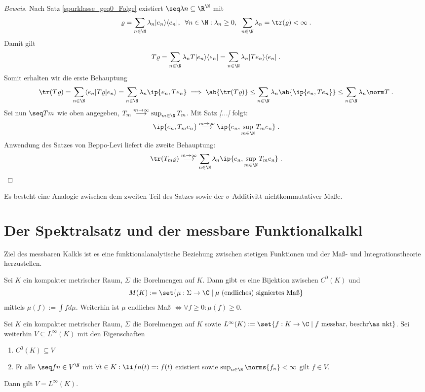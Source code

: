 \begin{proof}[Beweis]
	Nach Satz \ref{spurklasse_geq0_Folge} existiert \(\seq \lambda n \subseteq \R^\N\) mit 
	\[\varrho = \sum_{n\in\N} \lambda_n | e_n \rangle \langle e_n |, \;\; \forall n\in\N: \lambda_n \geq 0, \;\;\sum_{n\in\N} \lambda_n = \tr(\varrho) < \infty\;.\]
	Damit gilt
	\[T\varrho = \sum_{n\in\N} \lambda_n T | e_n \rangle \langle e_n | = \sum_{n\in\N} \lambda_n | Te_n \rangle \langle e_n | \;.\]
	Somit erhalten wir die erste Behauptung
	\[\tr(T\varrho) = \sum_{n\in\N} \langle e_n | T\varrho | e_n \rangle = \sum_{n\in\N} \lambda_n \ip{e_n, Te_n} \implies \ab{\tr(T\varrho)} \leq \sum_{n\in\N} \lambda_n \ab{\ip{e_n, Te_n}} \leq \sum_{n\in\N} \lambda_n\norm T\;.\]
	Sei nun \(\seq Tm\) wie oben angegeben, \(T_m \overset{m\to\infty}{\longrightarrow} \sup_{m\in\N}T_m\). Mit Satz \textit{[...]} folgt:
	\[\ip{e_n, T_m e_n} \overset{m\to\infty}{\longrightarrow} \ip{e_n, \sup_{m\in\N} T_m e_n}\;.\]
	Anwendung des Satzes von Beppo-Levi liefert die zweite Behauptung:
	\[\tr(T_m\varrho)\overset{m\to\infty}{\longrightarrow}  \sum_{n\in\N} \lambda_n\ip{e_n, \sup_{m\in\N} T_m e_n}\;.\]
\end{proof}
\begin{rem}
	Es besteht eine Analogie zwischen dem zweiten Teil des Satzes sowie der $\sigma$-Additivit\as t nichtkommutativer Ma\ss{}e. 
\end{rem}

\section{Der Spektralsatz und der messbare Funktionalkalk\us l}
\begin{rem}
	Ziel des messbaren Kalk\us ls ist es eine funktionalanalytische Beziehung zwischen stetigen Funktionen und der Ma\ss{}- und Integrationstheorie herzustellen.
\end{rem}

\begin{theorem}
	Sei $K$ ein kompakter metrischer Raum, $\Sigma$ die Borelmengen auf $K$. Dann gibt es eine Bijektion zwischen $C^0(K)$ und 
	\[M(K) := \set{\mu:\Sigma \to \C\;\vert\; \mu \text{ (endliches) signiertes Ma\ss{}}}\]
	mittels \(\mu(f):= \int f d\mu\). Weiterhin ist $\mu$ endliches Ma\ss{} \(\iff \forall f \geq 0 : \mu(f) \geq 0\).
\end{theorem}

\begin{theorem}
	Sei $K$ ein kompakter metrischer Raum, $\Sigma$ die Borelmengen auf $K$ sowie \(L^\infty(K):= \set{f: K\to\C\;\vert\; f \text{ messbar, beschr\as nkt}}\). Sei weiterhin \(V\subseteq L^\infty(K)\) mit den Eigenschaften \label{lemma_mess_kalk}
	\begin{enumerate}
		\item \(C^0(K)\subseteq V\)
		\item F\us r alle \(\seq fn \in V^\N\) mit \(\forall t \in K: \li fn(t) =: f(t)\) existiert sowie  \(\sup_{n\in\N}\norms{f_n} < \infty\) gilt \(f\in V\). \label{lemma_mess_kalk_2}
	\end{enumerate}
	Dann gilt \(V = L^\infty(K)\).
\end{theorem}

